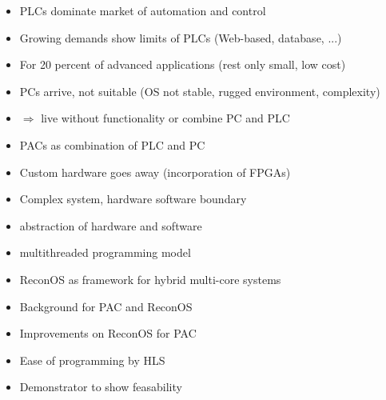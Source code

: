 \begin{itemize}
\item \acp{PLC} dominate market of automation and control
\item Growing demands show limits of \acp{PLC} (Web-based, database, ...)
\item For 20 percent of advanced applications (rest only small, low cost)
\item PCs arrive, not suitable (OS not stable, rugged environment, complexity)
\item $\Rightarrow$ live without functionality or combine PC and PLC
\item \acp{PAC} as combination of PLC and PC
\item Custom hardware goes away (incorporation of FPGAs)
\item Complex system, hardware software boundary
\item abstraction of hardware and software
\item multithreaded programming model
\item ReconOS as framework for hybrid multi-core systems
\end{itemize}


\begin{itemize}
\item Background for PAC and ReconOS
\item Improvements on ReconOS for PAC
\item Ease of programming by HLS
\item Demonstrator to show feasability
\end{itemize}